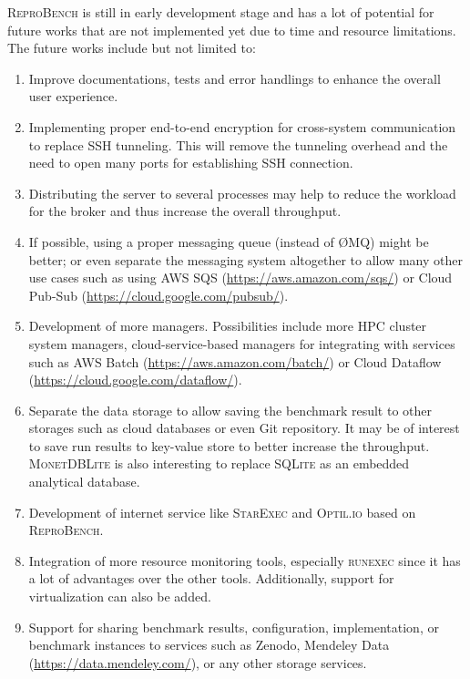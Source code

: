 \textsc{ReproBench} is still in early development stage and has a lot of potential for future works that are not implemented yet due to time and resource limitations.
The future works include but not limited to:

\begin{enumerate}
    \item Improve documentations, tests and error handlings to enhance the overall user experience.
    \item Implementing proper end-to-end encryption for cross-system communication to replace SSH tunneling. This will remove the tunneling overhead and the need to open many ports for establishing SSH connection.
    \item Distributing the server to several processes may help to reduce the workload for the broker and thus increase the overall throughput.
    \item If possible, using a proper messaging queue (instead of \O MQ) might be better; or even separate the messaging system altogether to allow many other use cases such as using AWS SQS (\url{https://aws.amazon.com/sqs/}) or Cloud Pub-Sub (\url{https://cloud.google.com/pubsub/}).
    \item Development of more managers. Possibilities include more HPC cluster system managers, cloud-service-based managers for integrating with services such as AWS Batch (\url{https://aws.amazon.com/batch/}) or Cloud Dataflow (\url{https://cloud.google.com/dataflow/}).
    \item Separate the data storage to allow saving the benchmark result to other storages such as cloud databases or even Git repository. It may be of interest to save run results to key-value store to better increase the throughput. \textsc{MonetDBLite} \citep{raasveldtMonetDBLiteEmbeddedAnalytical2018} is also interesting to replace \textsc{SQLite} as an embedded analytical database.
    \item Development of internet service like \textsc{StarExec} and \textsc{Optil.io} based on \textsc{ReproBench}.
    \item Integration of more resource monitoring tools, especially \textsc{runexec} since it has a lot of advantages over the other tools. Additionally, support for virtualization can also be added.
    \item Support for sharing benchmark results, configuration, implementation, or benchmark instances to services such as Zenodo, Mendeley Data (\url{https://data.mendeley.com/}), or any other storage services.
\end{enumerate}

